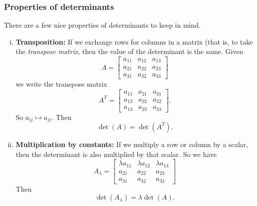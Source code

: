         \subsubsection{Properties of determinants}
        There are a few nice properties of determinants to keep in mind. 
        \begin{enumerate}[(i)]
            \item \textbf{Transposition:} If we exchange rows for columns in a matrix (that is, to take the \emph{transpose matrix}, then the value of the determinant is the same. Given
            \[
            A=\begin{bmatrix}
            a_{11} & a_{12} & a_{13}\\
            a_{21} & a_{22} & a_{23}\\
            a_{31} & a_{32} & a_{33}
            \end{bmatrix}
            \]
            we write the transpose matrix
            \[
            A^T=\begin{bmatrix}
            a_{11} & a_{21} & a_{31}\\
            a_{12} & a_{22} & a_{32}\\
            a_{13} & a_{23} & a_{33}
            \end{bmatrix}.
            \]
            So $a_{ij}\mapsto a_{ji}$. Then
            \[
            \det(A)=\det(A^T).
            \]
            
            \item \textbf{Multiplication by constants:} If we multiply a row or column by a scalar, then the determinant is also multiplied by that scalar.  So we have
            \[
            A_\lambda=\begin{bmatrix}
            \lambda a_{11} & \lambda a_{12} & \lambda a_{13}\\
            a_{21} & a_{22} & a_{23}\\
            a_{31} & a_{32} & a_{33}
            \end{bmatrix}
            \]
            Then
            \[
            \det(A_\lambda)=\lambda \det(A).
            \]
            

\end{enumerate}
